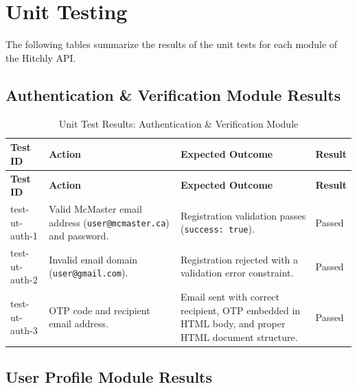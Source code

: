 \section{Unit Testing}

The following tables summarize the results of the unit tests for each module of the Hitchly API.

\subsection{Authentication \& Verification Module Results}

\small
\begin{longtable}{|p{}|>{\raggedright\arraybackslash}p{}|>{\raggedright\arraybackslash}p{}|p{}|}
\hline
\textbf{Test ID} & \textbf{Action} & \textbf{Expected Outcome} & \textbf{Result} \\
\hline
\endfirsthead

\hline
\textbf{Test ID} & \textbf{Action} & \textbf{Expected Outcome} & \textbf{Result} \\
\hline
\endhead

\hline
\endfoot

\hline
\caption{Unit Test Results: Authentication \& Verification Module}
\endlastfoot

test-ut-auth-1 & Valid McMaster email address (\texttt{user@mcmaster.ca}) and password. & Registration validation passes (\texttt{success: true}). & Passed \\
\hline
test-ut-auth-2 & Invalid email domain (\texttt{user@gmail.com}). & Registration rejected with a validation error constraint. & Passed \\
\hline
test-ut-auth-3 & OTP code and recipient email address. & Email sent with correct recipient, OTP embedded in HTML body, and proper HTML document structure. & Passed \\
\hline
\end{longtable}

\subsection{User Profile Module Results}


